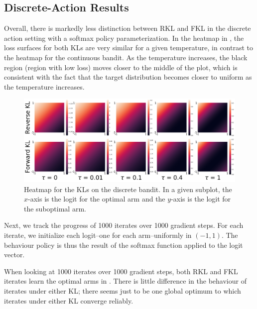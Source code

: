 \documentclass[twoside,11pt]{article}
\begin{document}
 
\subsection{Discrete-Action Results}\label{sec:microworld-discrete-actions}

Overall, there is markedly less distinction between RKL and FKL in the discrete action setting with a softmax policy parameterization. In the heatmap in , the loss surfaces for both KLs are very similar for a given temperature, in contrast to the heatmap for the continuous bandit. As the temperature increases, the black region (region with low loss) moves closer to the middle of the plot, which is consistent with the fact that the target distribution becomes closer to uniform as the temperature increases. 
\begin{figure}[!htb]
    \centering
    \includegraphics[width=1\columnwidth]{figs/discrete-bandit/heatmaps/discrete.png}
    \caption{Heatmap for the KLs on the discrete bandit. In a given subplot, the $x$-axis is the logit for the optimal arm and the $y$-axis is the logit for the suboptimal arm.}
    \label{fig:discrete-heatmap}
  \end{figure}

Next, we track the progress of 1000 iterates over 1000 gradient steps. For each iterate, we initialize each logit--one for each arm--uniformly in $(-1, 1)$. The behaviour policy is thus the result of the softmax function applied to the logit vector. 

When looking at 1000 iterates over 1000 gradient steps, both RKL and FKL iterates learn the optimal arms in . There is little difference in the behaviour of iterates under either KL; there seems just to be one global optimum to which iterates under either KL converge reliably. 

  
\end{document}
